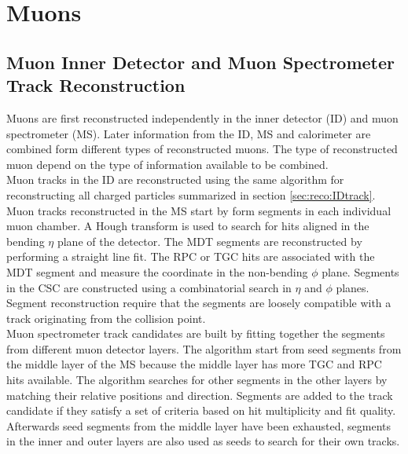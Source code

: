 \section{Muons}
\label{sec:reco:muon}

\subsection{Muon Inner Detector and Muon Spectrometer Track Reconstruction}
\label{sec:reco:IDMStrk}

\indent Muons are first reconstructed independently in the inner detector (ID) and muon spectrometer (MS). Later information from the ID, MS and calorimeter are combined form different types of reconstructed muons.  The type of reconstructed muon depend on the type of information available to be combined.\cite{MuonReco} \\

\indent Muon tracks in the ID are reconstructed using the same algorithm for reconstructing all charged particles summarized in section \ref{sec:reco:IDtrack}. \\

\indent Muon tracks reconstructed in the MS start by form segments in each individual muon chamber.  A Hough transform is used to search for hits aligned in the bending $\eta$ plane of the detector.\cite{HoughTrans}  The MDT segments are reconstructed by performing a straight line fit.  The RPC or TGC hits are associated with the MDT segment and measure the coordinate in the non-bending $\phi$ plane.  Segments in the CSC are constructed using a combinatorial search in $\eta$ and $\phi$ planes.  Segment reconstruction require that the segments are loosely compatible with a track originating from the collision point.  \\

\indent Muon spectrometer track candidates are built by fitting together the segments from different muon detector layers.  The algorithm start from seed segments from the middle layer of the MS because the middle layer has more TGC and RPC hits available.  The algorithm searches for other segments in the other layers by matching their relative positions and direction.  Segments are added to the track candidate if they satisfy a set of criteria based on hit multiplicity and fit quality.   Afterwards seed segments from the middle layer have been exhausted, segments in the inner and outer layers are also used as seeds to search for their own tracks.  \\

